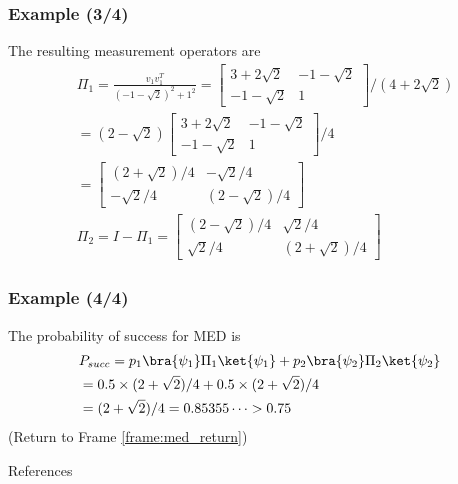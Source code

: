 \documentclass{beamer}
\begin{document}
\begin{frame}
    \frametitle{Example (3/4)}
    The resulting measurement operators are
    \begin{align*}
         & \Pi_{1} = \frac{v_{1}v_{1}^{T}}{(-1 - \sqrt{2})^{2} + 1^{2}}
        = \begin{bmatrix}
              3 + 2\sqrt{2} & -1 - \sqrt{2} \\
              -1 - \sqrt{2} & 1
          \end{bmatrix}
        / (4 + 2\sqrt{2})                                               \\
         & = (2 - \sqrt{2})\begin{bmatrix}
                               3 + 2\sqrt{2} & -1 - \sqrt{2} \\
                               -1 - \sqrt{2} & 1
                           \end{bmatrix}
        / 4                                                             \\
         & = \begin{bmatrix}
                 (2 + \sqrt{2})/4 & - \sqrt{2}/4     \\
                 - \sqrt{2}/4     & (2 - \sqrt{2})/4
             \end{bmatrix}                        \\
         & \Pi_{2} = I - \Pi_{1} = \begin{bmatrix}
                                       (2 - \sqrt{2})/4 & \sqrt{2}/4       \\
                                       \sqrt{2}/4       & (2 + \sqrt{2})/4
                                   \end{bmatrix}
    \end{align*}
\end{frame}

\begin{frame}
    \frametitle{Example (4/4)}
    The probability of success for MED is
    \begin{align}
         & P_{succ} = p_{1} \bra{\psi_{1}} \Pi_{1} \ket{\psi_{1}}
        + p_{2} \bra{\psi_{2}} \Pi_{2} \ket{\psi_{2}}                  \\
         & = 0.5 \times (2 + \sqrt{2})/4 + 0.5 \times (2 + \sqrt{2})/4 \\
         & = (2 + \sqrt{2})/4 = 0.85355\dots > 0.75
    \end{align}
    (Return to Frame \ref{frame:med_return})
\end{frame}

\begin{frame}[allowframebreaks]{References}
    
\end{frame}
\end{document}
